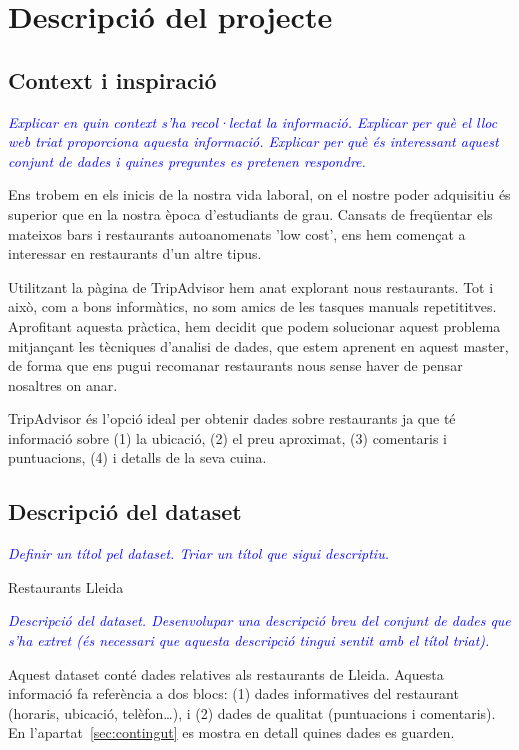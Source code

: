 \documentclass{article}
\title{\large \subject \\ \activity}
\author{Josep Alòs Pascual, Daniel Galan Vilella}
\date{\today}
\newcommand\enunciat[2][blue]{\textcolor{#1}{\emph{#2}}}
\begin{document}
\maketitle

\section{Descripció del projecte}
\subsection{Context i inspiració}
\enunciat{Explicar en quin context s'ha recol·lectat la informació. Explicar per
què el lloc web triat proporciona aquesta informació. Explicar per què és
interessant aquest conjunt de dades i quines preguntes es pretenen respondre.}

Ens trobem en els inicis de la nostra vida laboral, on el nostre poder
adquisitiu és superior que en la nostra època d'estudiants de grau. Cansats de
freqüentar els mateixos bars i restaurants autoanomenats 'low cost', ens hem
començat a interessar en restaurants d'un altre tipus.

Utilitzant la pàgina de TripAdvisor hem anat explorant nous restaurants. Tot i
això, com a bons informàtics, no som amics de les tasques manuals repetititves.
Aprofitant aquesta pràctica, hem decidit que podem solucionar aquest problema
mitjançant les tècniques d'analisi de dades, que estem aprenent en aquest
master, de forma que ens pugui recomanar restaurants nous sense haver de pensar
nosaltres on anar.

TripAdvisor és l'opció ideal per obtenir dades sobre restaurants ja que té
informació sobre (1) la ubicació, (2) el preu aproximat, (3) comentaris i
puntuacions, (4) i detalls de la seva cuina.


\subsection{Descripció del dataset}
\enunciat{Definir un títol pel dataset. Triar un títol que sigui descriptiu.}

Restaurants Lleida

\enunciat{Descripció del dataset. Desenvolupar una descripció breu del conjunt
de dades que s'ha extret (és necessari que aquesta descripció tingui sentit amb
el títol triat).}

Aquest dataset conté dades relatives als restaurants de Lleida. Aquesta
informació fa referència a dos blocs: (1) dades informatives del restaurant
(horaris, ubicació, telèfon\dots), i (2) dades de qualitat (puntuacions i
comentaris). En l'apartat~\ref{sec:contingut} es mostra en detall quines dades
es guarden.
\end{document}
